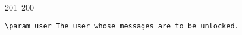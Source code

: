 201~200~\documentclass{article}
\begin{document}
\begin{lstlisting}[language=Python, caption=Unlock messages]
	                                                                                                                                                                                                                                                                                                	                                                                                                                                        	    	                                                                                                	                                                                                                                                    \param user The user whose messages are to be unlocked.
	                                                                                                                                                                                                                                                                                                	                                                                                                                                        	    	                                                                                                	                                                                                                                                        """
	                                                                                                                                                                                                                                                                                                	                                                                                                                                        	    	                                                                                                	                                                                                                                                            message_ids = db_local_message.getUndecryptedUnlockedMessageIDs()
	                                                                                                                                                                                                                                                                                                	                                                                                                                                        	    	                                                                                                	                                                                                                                                                ephemeral_keys = server.get_message_ephemeral_public_keys(user.username, user.hashedPassword, message_ids)

\end{lstlisting}
\end{document}
